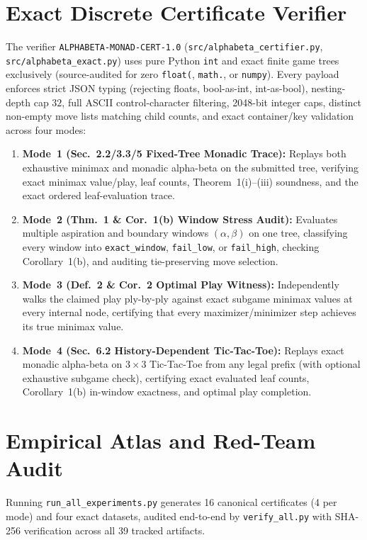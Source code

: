 \documentclass[10pt,twocolumn]{article}
\begin{document}
\section{Exact Discrete Certificate Verifier}\label{sec:cert}
The verifier \texttt{ALPHABETA-MONAD-CERT-1.0} (\texttt{src/alphabeta\_certifier.py}, \texttt{src/alphabeta\_exact.py}) uses pure Python \texttt{int} and exact finite game trees exclusively (source-audited for zero \texttt{float(}, \texttt{math.}, or \texttt{numpy}). Every payload enforces strict JSON typing (rejecting floats, bool-as-int, int-as-bool), nesting-depth cap $32$, full ASCII control-character filtering, 2048-bit integer caps, distinct non-empty move lists matching child counts, and exact container/key validation across four modes:
\begin{enumerate}[leftmargin=*,nosep]
  \item \textbf{Mode~1 (Sec.~2.2/3.3/5 Fixed-Tree Monadic Trace):} Replays both exhaustive minimax and monadic alpha-beta on the submitted tree, verifying exact minimax value/play, leaf counts, Theorem~1(i)--(iii) soundness, and the exact ordered leaf-evaluation trace.
  \item \textbf{Mode~2 (Thm.~1 \& Cor.~1(b) Window Stress Audit):} Evaluates multiple aspiration and boundary windows $(\alpha,\beta)$ on one tree, classifying every window into \texttt{exact\_window}, \texttt{fail\_low}, or \texttt{fail\_high}, checking Corollary~1(b), and auditing tie-preserving move selection.
  \item \textbf{Mode~3 (Def.~2 \& Cor.~2 Optimal Play Witness):} Independently walks the claimed play ply-by-ply against exact subgame minimax values at every internal node, certifying that every maximizer/minimizer step achieves its true minimax value.
  \item \textbf{Mode~4 (Sec.~6.2 History-Dependent Tic-Tac-Toe):} Replays exact monadic alpha-beta on $3\times 3$ Tic-Tac-Toe from any legal prefix (with optional exhaustive subgame check), certifying exact evaluated leaf counts, Corollary~1(b) in-window exactness, and optimal play completion.
\end{enumerate}

\section{Empirical Atlas and Red-Team Audit}\label{sec:results}
Running \texttt{run\_all\_experiments.py} generates 16 canonical certificates (4 per mode) and four exact datasets, audited end-to-end by \texttt{verify\_all.py} with SHA-256 verification across all 39 tracked artifacts.
\end{document}
